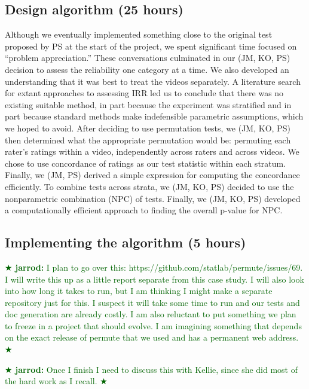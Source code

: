 \documentclass[]{article}
\newcommand{\jarrod}[1] { \textcolor{darkgreen} {
\ensuremath{\bigstar} {\bf jarrod:}  {#1}
\ensuremath{\bigstar} } }
\begin{document}
\subsection{Design algorithm (25 hours)}

Although we eventually implemented something close to the original test
proposed by PS at the start of the project, we spent significant time
focused on  ``problem appreciation.''  These conversations culminated
in our (JM, KO, PS) decision to assess the reliability one category at a time.
We also developed an understanding that it was best to treat the videos
separately.  A literature search for extant approaches to assessing IRR
led us to conclude that there was no existing suitable method, in part because
the experiment was stratified and in part because standard methods make
indefensible parametric assumptions, which we hoped to avoid.
After deciding to use permutation tests, we (JM, KO, PS) then determined what
the appropriate permutation would be: permuting each rater's ratings within a
video, independently across raters and across videos.
We chose to use concordance of ratings as our test statistic within each
stratum.  Finally, we (JM, PS) derived a simple expression for computing the
concordance efficiently.
To combine tests across strata, we (JM, KO, PS) decided to use the nonparametric
combination (NPC) of tests.
Finally, we (JM, KO, PS) developed a computationally efficient approach to
finding the overall p-value for NPC.

\subsection{Implementing the algorithm (5 hours)}

\jarrod{I plan to go over this:  https://github.com/statlab/permute/issues/69.
I will write this up as a little report separate from this case study.  I will
also look into how long it takes to run, but I am thinking I might make a
separate repository just for this.  I suspect it will take some time to run and
our tests and doc generation are already costly.  I am also reluctant to put
something we plan to freeze in a project that should evolve.  I am imagining
something that depends on the exact release of permute that we used and has a
permanent web address.}

\jarrod{Once I finish I need to discuss this with Kellie, since she did most of
the hard work as I recall.}
  
\end{document}

